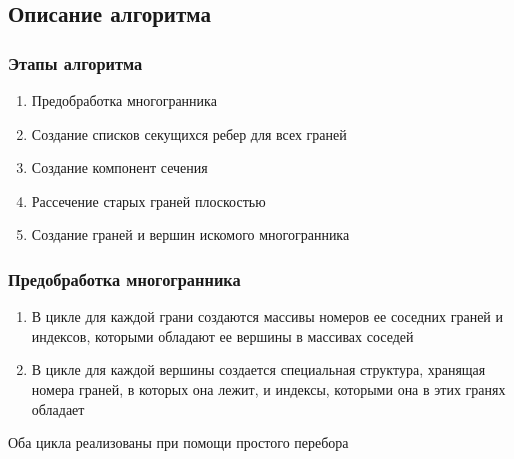 \documentclass[a4paper,12pt, titlepage]{article}
\begin{document}
\subsection{Описание алгоритма}

\subsubsection{Этапы алгоритма}
	\begin{flushleft}
		\begin{enumerate}
			\item Предобработка многогранника
			\item Создание списков секущихся ребер для всех граней
			\item Создание компонент сечения
			\item Рассечение старых граней плоскостью
			\item Создание граней и вершин искомого многогранника
		\end{enumerate}
	\end{flushleft}

\subsubsection{Предобработка многогранника}
	\begin{flushleft}
		\begin{enumerate}
			\item В цикле для каждой грани создаются массивы номеров ее соседних граней и 
			индексов, которыми обладают ее вершины в массивах соседей
			\item В цикле для каждой вершины создается специальная структура, хранящая 
			номера граней, в которых она лежит, и индексы, которыми она в этих гранях 
			обладает
		\end{enumerate}
	\end{flushleft}
	\begin{flushleft}
		Оба цикла реализованы при помощи простого перебора
	\end{flushleft}
\end{document}
